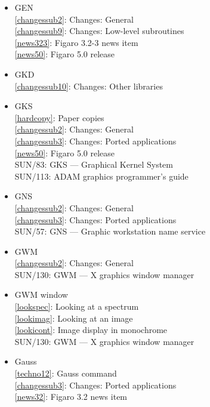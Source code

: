 \documentclass[11pt,twoside]{article}
\newcommand{\htmlref}[2]{#1}
\newcommand{\xref}[3]{#1}
\newcommand{\idxint}[2]{\ref{#1}: \htmlref{#2}{#1}}
\newcommand{\idxint}[2]{\htmlref{#2}{#1}}
\newcommand{\latorhtm}[2]{#1}
\newcommand{\latorhtm}[2]{#2}
\begin{document}
\begin{itemize}
\item GEN\\
   \idxint{changessub2}{Changes: General}\\
   \idxint{changessub9}{Changes: Low-level subroutines}\\
   \idxint{news323}{Figaro 3.2-3 news item}\\
   \idxint{news50}{Figaro 5.0 release}
\item GKD\\
   \idxint{changessub10}{Changes: Other libraries}
\item GKS\\
   \idxint{hardcopy}{Paper copies}\\
   \idxint{changessub2}{Changes: General}\\
   \idxint{changessub3}{Changes: Ported applications}\\
   \idxint{news50}{Figaro 5.0 release}\\
   \xref{SUN/83: GKS \latorhtm{---}{-} Graphical Kernel System}{sun83}{}\\
   \xref{SUN/113: ADAM graphics programmer's guide}{sun113}{}
\item GNS\\
   \idxint{changessub2}{Changes: General}\\
   \idxint{changessub3}{Changes: Ported applications}\\
   \xref{SUN/57: GNS \latorhtm{---}{-} Graphic workstation name service}{sun57}{}
\item GWM\\
   \idxint{changessub2}{Changes: General}\\
   \xref{SUN/130: GWM \latorhtm{---}{-} X graphics window manager}{sun130}{}
\item GWM window\\
   \idxint{lookspec}{Looking at a spectrum}\\
   \idxint{lookimag}{Looking at an image}\\
   \idxint{lookicont}{Image display in monochrome}\\
   \xref{SUN/130: GWM \latorhtm{---}{-} X graphics window manager}{sun130}{}
\item Gauss\\
   \idxint{techno12}{Gauss command}\\
   \idxint{changessub3}{Changes: Ported applications}\\
   \idxint{news32}{Figaro 3.2 news item}\\

\end{itemize}
\end{document}
